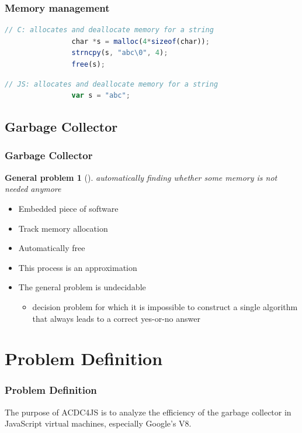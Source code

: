 \documentclass{beamer}
\begin{document}
	\begin{frame}[fragile]
		\frametitle{Memory management}
			\begin{lstlisting}[language=JavaScript]
				// C: allocates and deallocate memory for a string
				char *s = malloc(4*sizeof(char));
				strncpy(s, "abc\0", 4);
				free(s);
			\end{lstlisting}			
			
			\pause
			
			\begin{lstlisting}[language=JavaScript]
				// JS: allocates and deallocate memory for a string
				var s = "abc";
			\end{lstlisting}	
			
	\end{frame}
	
	\subsection{Garbage Collector} 
	\begin{frame}
		\frametitle{Garbage Collector}
		\newtheorem{general problem}{General problem}
		\begin{general problem}[] \label{gp:garbage_collector}
			automatically finding whether some memory is not needed anymore
		\end{general problem}
		
		\begin{itemize}
			\item Embedded piece of software
			\item Track memory allocation
			\item Automatically free  
			\item This process is an approximation
			\item The general problem is undecidable
			\begin{itemize}
				\item decision problem for which it is impossible to construct a single algorithm that always leads to a correct yes-or-no answer
			\end{itemize}
		\end{itemize}
	\end{frame}
	
	\section{Problem Definition} 
	\begin{frame}
		\frametitle{Problem Definition}
		The purpose of ACDC4JS is to analyze the efficiency of the garbage collector in JavaScript virtual machines, especially Google's V8.
	\end{frame}
	
\end{document}
